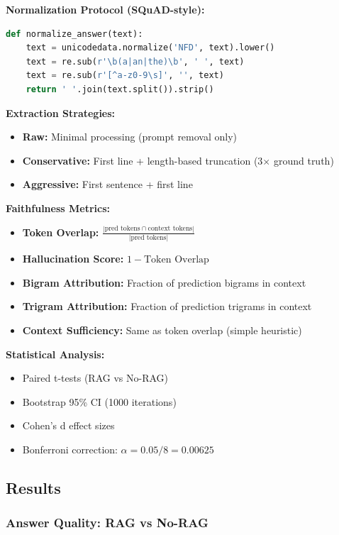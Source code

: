\documentclass[11pt,a4paper]{article}
\begin{document}
\textbf{Normalization Protocol (SQuAD-style):}
\begin{lstlisting}[language=Python]
def normalize_answer(text):
    text = unicodedata.normalize('NFD', text).lower()
    text = re.sub(r'\b(a|an|the)\b', ' ', text)
    text = re.sub(r'[^a-z0-9\s]', '', text)
    return ' '.join(text.split()).strip()
\end{lstlisting}

\textbf{Extraction Strategies:}
\begin{itemize}
\item \textbf{Raw:} Minimal processing (prompt removal only)
\item \textbf{Conservative:} First line + length-based truncation (3$\times$ ground truth)
\item \textbf{Aggressive:} First sentence + first line
\end{itemize}

\textbf{Faithfulness Metrics:}
\begin{itemize}
\item \textbf{Token Overlap:} $\frac{|\text{pred tokens} \cap \text{context tokens}|}{|\text{pred tokens}|}$
\item \textbf{Hallucination Score:} $1 - \text{Token Overlap}$
\item \textbf{Bigram Attribution:} Fraction of prediction bigrams in context
\item \textbf{Trigram Attribution:} Fraction of prediction trigrams in context
\item \textbf{Context Sufficiency:} Same as token overlap (simple heuristic)
\end{itemize}

\textbf{Statistical Analysis:}
\begin{itemize}
\item Paired t-tests (RAG vs No-RAG)
\item Bootstrap 95\% CI (1000 iterations)
\item Cohen's d effect sizes
\item Bonferroni correction: $\alpha = 0.05/8 = 0.00625$
\end{itemize}

\subsection{Results}

\subsubsection{Answer Quality: RAG vs No-RAG}
\end{document}
